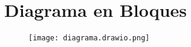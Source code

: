 \documentclass[../informe_krapp.tex]{subfiles}
\begin{document}
\section{Diagrama en Bloques}
\begin{figure}[H]
	\texttt{[image: diagrama.drawio.png]}
	\centering

\end{figure}
\end{document}
